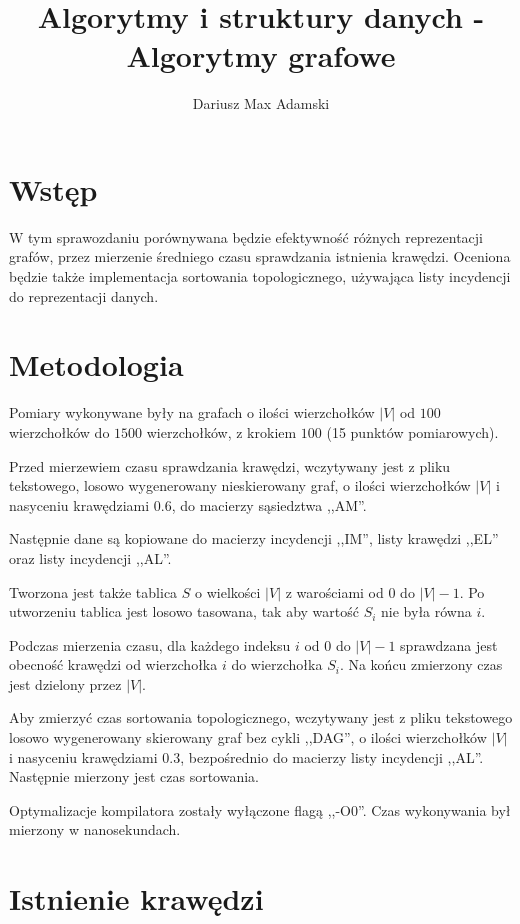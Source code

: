 \documentclass[11pt,twocolumn]{article}
\title{Algorytmy i struktury danych - Algorytmy grafowe}
\author{Dariusz Max Adamski}
\date{}
\begin{document}
\maketitle



\section*{Wstęp}

W tym sprawozdaniu porównywana będzie efektywność różnych reprezentacji grafów, 
przez mierzenie średniego czasu sprawdzania istnienia krawędzi. 
Oceniona będzie także implementacja sortowania topologicznego, 
używająca listy incydencji do reprezentacji danych.


\section*{Metodologia}

Pomiary wykonywane były na grafach o ilości wierzchołków $|V|$ od $100$ wierzchołków do $1500$ wierzchołków, z krokiem $100$ (15 punktów pomiarowych).

Przed mierzewiem czasu sprawdzania krawędzi, wczytywany jest z pliku tekstowego, 
losowo wygenerowany nieskierowany graf, o ilości wierzchołków $|V|$ 
i nasyceniu krawędziami 0.6, do macierzy sąsiedztwa ,,AM''.

Następnie dane są kopiowane do macierzy incydencji ,,IM'', listy krawędzi ,,EL'' oraz listy incydencji ,,AL''.

Tworzona jest także tablica $S$ o wielkości $|V|$ z warościami od 0 do $|V|-1$. 
Po utworzeniu tablica jest losowo tasowana, tak aby wartość $S_i$ nie była równa $i$.

Podczas mierzenia czasu, dla każdego indeksu $i$ od 0 do $|V|-1$ sprawdzana 
jest obecność krawędzi od wierzchołka $i$ do wierzchołka $S_i$. 
Na końcu zmierzony czas jest dzielony przez $|V|$.

Aby zmierzyć czas sortowania topologicznego, wczytywany jest z pliku tekstowego 
losowo wygenerowany skierowany graf bez cykli ,,DAG'', o ilości wierzchołków $|V|$ 
i nasyceniu krawędziami 0.3, bezpośrednio do macierzy listy incydencji ,,AL''. 
Następnie mierzony jest czas sortowania.

Optymalizacje kompilatora zostały wyłączone flagą ,,-O0''. 
Czas wykonywania był mierzony w nanosekundach.


\section{Istnienie krawędzi}
\end{document}
